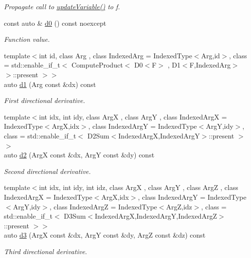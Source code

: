 \begin{DoxyCompactItemize}
\begin{DoxyCompactList}\small\item\em Propagate call to \hyperlink{structRFFGen_1_1MathematicalOperations_1_1Squared_a2b6d89fb45e7bc60eda730ea1b767b69}{update\-Variable()} to f. \end{DoxyCompactList}\item 
\hypertarget{structRFFGen_1_1MathematicalOperations_1_1Squared_a2d16f0c33070d97591049e100a76ba68}{const auto \& \hyperlink{structRFFGen_1_1MathematicalOperations_1_1Squared_a2d16f0c33070d97591049e100a76ba68}{d0} () const noexcept}\label{structRFFGen_1_1MathematicalOperations_1_1Squared_a2d16f0c33070d97591049e100a76ba68}

\begin{DoxyCompactList}\small\item\em Function value. \end{DoxyCompactList}\item 
{\footnotesize template$<$int id, class Arg , class Indexed\-Arg  = Indexed\-Type$<$\-Arg,id$>$, class  = std\-::enable\-\_\-if\-\_\-t$<$ Compute\-Product$<$ D0$<$\-F$>$ , D1$<$\-F,\-Indexed\-Arg$>$ $>$\-::present $>$$>$ }\\auto \hyperlink{structRFFGen_1_1MathematicalOperations_1_1Squared_af0f8a775774e5378962fa20e6f909d5d}{d1} (Arg const \&dx) const 
\begin{DoxyCompactList}\small\item\em First directional derivative. \end{DoxyCompactList}\item 
{\footnotesize template$<$int idx, int idy, class Arg\-X , class Arg\-Y , class Indexed\-Arg\-X  = Indexed\-Type$<$\-Arg\-X,idx$>$, class Indexed\-Arg\-Y  = Indexed\-Type$<$\-Arg\-Y,idy$>$, class  = std\-::enable\-\_\-if\-\_\-t$<$ D2\-Sum$<$\-Indexed\-Arg\-X,\-Indexed\-Arg\-Y$>$\-::present $>$$>$ }\\auto \hyperlink{structRFFGen_1_1MathematicalOperations_1_1Squared_a52553adbecffba775c50573e7d478897}{d2} (Arg\-X const \&dx, Arg\-Y const \&dy) const 
\begin{DoxyCompactList}\small\item\em Second directional derivative. \end{DoxyCompactList}\item 
{\footnotesize template$<$int idx, int idy, int idz, class Arg\-X , class Arg\-Y , class Arg\-Z , class Indexed\-Arg\-X  = Indexed\-Type$<$\-Arg\-X,idx$>$, class Indexed\-Arg\-Y  = Indexed\-Type$<$\-Arg\-Y,idy$>$, class Indexed\-Arg\-Z  = Indexed\-Type$<$\-Arg\-Z,idz$>$, class  = std\-::enable\-\_\-if\-\_\-t$<$ D3\-Sum$<$\-Indexed\-Arg\-X,\-Indexed\-Arg\-Y,\-Indexed\-Arg\-Z$>$\-::present $>$$>$ }\\auto \hyperlink{structRFFGen_1_1MathematicalOperations_1_1Squared_ae218404caefa109f0bdf0f94ff9e48e6}{d3} (Arg\-X const \&dx, Arg\-Y const \&dy, Arg\-Z const \&dz) const 
\begin{DoxyCompactList}\small\item\em Third directional derivative. \end{DoxyCompactList}\end{DoxyCompactItemize}


